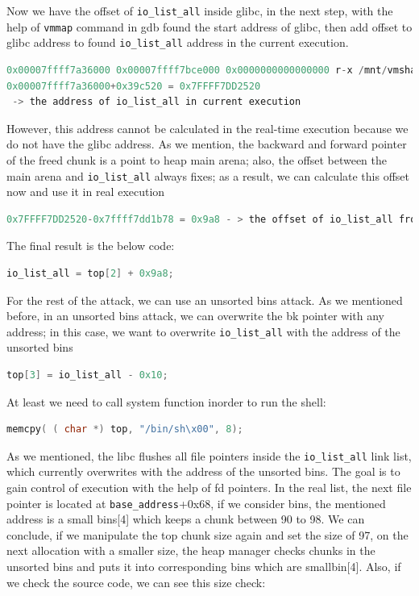 \documentclass{masterthesis}
\newcommand*\libc{glibc}
\newcommand*\ub{unsorted bins}
\newcommand*\sbs{small bins}
\begin{document}
Now we have the offset of \lstinline{io_list_all} inside \libc{}, in the next step, with the help of \lstinline{vmmap} command in gdb found the start address of \libc{}, then add offset to \libc{} address to found \lstinline{io_list_all} address in the current execution.
\begin{lstlisting}[language=c,frame=tlrb]
0x00007ffff7a36000 0x00007ffff7bce000 0x0000000000000000 r-x /mnt/vmshare/MasterThesis/libc223/libc.so.6
0x00007ffff7a36000+0x39c520 = 0x7FFFF7DD2520
 -> the address of io_list_all in current execution
\end{lstlisting}



However, this address cannot be calculated in the real-time execution because we do not have the \libc{} address. As we mention, the backward and forward pointer of the freed chunk is a point to heap main arena; also, the offset between the main arena and \lstinline{io_list_all} always fixes; as a result, we can calculate this offset now and use it in real execution
\begin{lstlisting}[language=c,frame=tlrb]
0x7FFFF7DD2520-0x7ffff7dd1b78 = 0x9a8 - > the offset of io_list_all from main arena
\end{lstlisting}

The final result is the below code:

\begin{lstlisting}[language=c,frame=tlrb]
io_list_all = top[2] + 0x9a8;
\end{lstlisting}

For the rest of the attack, we can use an \ub{} attack. As we mentioned before, in an \ub{} attack, we can overwrite the bk pointer with any address; in this case, we want to overwrite \lstinline{io_list_all} with the address of the \ub{}

\begin{lstlisting}[language=c,frame=tlrb]
top[3] = io_list_all - 0x10;
\end{lstlisting}

At least we need to call system function inorder to run the shell:

\begin{lstlisting}[language=c,frame=tlrb]
memcpy( ( char *) top, "/bin/sh\x00", 8);
\end{lstlisting}


As we mentioned, the libc flushes all file pointers inside the \lstinline{io_list_all} link list, which currently overwrites with the address of the \ub{}.
The goal is to gain control of execution with the help of fd pointers. In the real list, the next file pointer is located at \lstinline{base_address}+0x68, if we consider bins, the mentioned address is a \sbs{}[4] which keeps a chunk between 90 to 98. We can conclude, if we manipulate the top chunk size again and set the size of 97, on the next allocation with a smaller size, the heap manager checks chunks in the \ub{} and puts it into corresponding bins which are smallbin[4]. Also, if we check the source code, we can see this size check:
\end{document}
